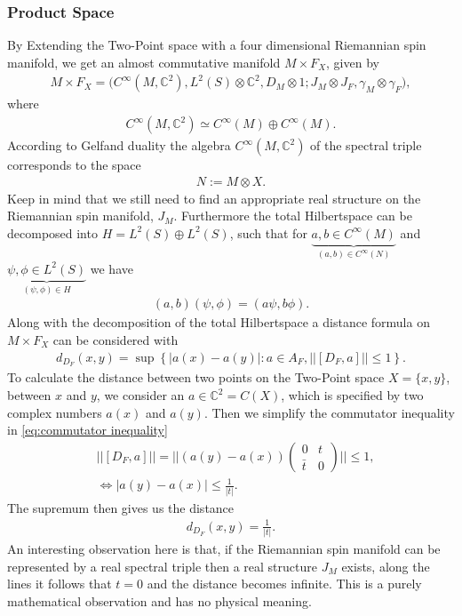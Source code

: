 \subsubsection{Product Space}
By Extending the Two-Point space with a four dimensional Riemannian spin
manifold, we get an almost commutative manifold $M\times F_X$, given by
\begin{align}
    M\times F_X = \big(C^\infty(M, \mathbb{C}^2), L^2(S)\otimes \mathbb{C}^2,
    D_M\otimes 1 ; J_M\otimes J_F, \gamma_M \otimes \gamma_F\big),
\end{align}
where
\begin{align}
   C^\infty(M, \mathbb{C}^2) \simeq C^\infty(M) \oplus  C^\infty(M).
\end{align}
According to Gelfand duality the algebra $C^\infty(M, \mathbb{C}^2)$ of the
spectral triple corresponds to the space
\begin{align}
    N:= M\otimes X.
\end{align}
Keep in mind that we still need to find an appropriate real structure on the
Riemannian spin manifold, $J_M$. Furthermore the total Hilbertspace can be
decomposed into $H = L^2(S) \oplus L^2(S)$, such that for $\underbrace{a,b\in
C^\infty(M)}_{(a, b) \in C^\infty(N)}$ and $\underbrace{\psi, \phi \in
L^2(S)}_{(\psi, \phi) \in H}$ we have
\begin{align}
    (a, b)(\psi, \phi) = (a\psi, b\phi).
\end{align}
Along with the decomposition of the total Hilbertspace a
distance formula on $M\times F_X$ can be considered with
\begin{align}\label{eq:commutator inequality}
    d_{D_F}(x,y) = \sup\left\{  |a(x) - a(y)|:a\in A_F, ||[D_F, a]|| \leq
    1 \right\}.
\end{align}
To calculate the distance between two points on the Two-Point space $X= \{x,
y\}$, between $x$ and $y$, we consider an $a \in \mathbb{C}^2 = C(X)$, which is
specified by two complex numbers $a(x)$ and $a(y)$. Then we simplify the
commutator inequality in \eqref{eq:commutator inequality}
\begin{align}
    &||[D_F , a]|| = ||(a(y) - a(x))\begin{pmatrix}0 &t\\\bar{t} &0
    \end{pmatrix}|| \leq 1,\\
    &\Leftrightarrow |a(y) - a(x)|\leq \frac{1}{|t|}.
\end{align}
The supremum then gives us the distance
\begin{align}
    d_{D_F} (x,y) = \frac{1}{|t|}.
\end{align}
An interesting observation here is that, if the Riemannian spin manifold can be
represented by a real spectral triple then a real structure $J_M$ exists,
along the lines it follows that $t=0$ and the distance becomes infinite. This is a
purely mathematical observation and has no physical meaning.

